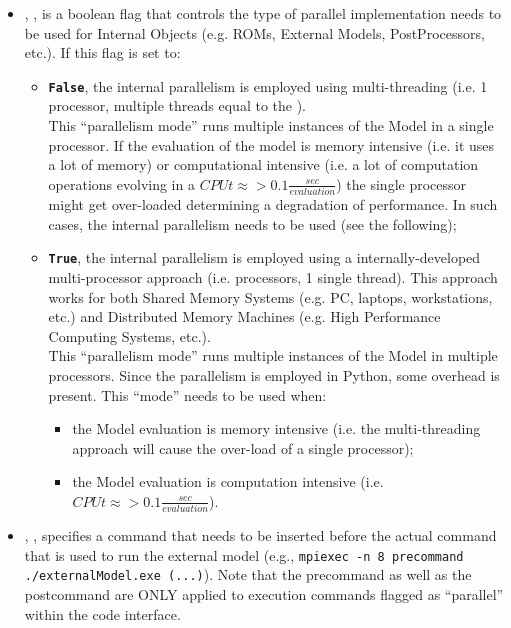 \begin{itemize}
\item {}, , is a boolean
flag that controls the type of parallel implementation needs to be used for Internal
Objects (e.g. ROMs, External Models, PostProcessors, etc.).
If this flag is set to:
\begin{itemize}
 \item  \textbf{\texttt{False}}, the internal parallelism is employed using multi-threading (i.e. 1 processor, multiple threads equal to the ).
\\\nb This ``parallelism mode'' runs multiple instances of the Model in a single processor. If the evaluation of the model is memory intensive (i.e. it uses a lot of memory) or computational intensive (i.e. a lot of computation operations evolving in a $CPUt  \approx >  0.1\frac{sec}{evaluation}$) the single processor might get over-loaded determining a degradation of performance. In such cases, the internal parallelism needs to be used (see the following);
 \item  \textbf{\texttt{True}}, the internal parallelism is employed using a internally-developed multi-processor approach (i.e.  processors, 1 single thread). This approach works for both Shared Memory Systems (e.g. PC, laptops, workstations, etc.) and Distributed Memory Machines (e.g. High Performance Computing Systems, etc.). 
 \\\nb This ``parallelism mode'' runs multiple instances of the Model in multiple processors. Since the parallelism is employed
 in Python, some overhead is present. This ``mode'' needs to be used when: 
 \begin{itemize}
  \item the Model evaluation is memory intensive (i.e. the multi-threading approach will cause the over-load of a single processor);
  \item the Model evaluation is computation intensive (i.e. $CPUt  \approx >  0.1\frac{sec}{evaluation}$).
 \end{itemize}
\end{itemize}
%



\item {}, , specifies
a command that needs to be inserted before the actual command that is used to
run the external model (e.g., \texttt{mpiexec -n 8 precommand
./externalModel.exe (...)}).
Note that the precommand as well as the postcommand are ONLY applied to
execution commands flagged as ``parallel'' within the code interface.
%


\end{itemize}
